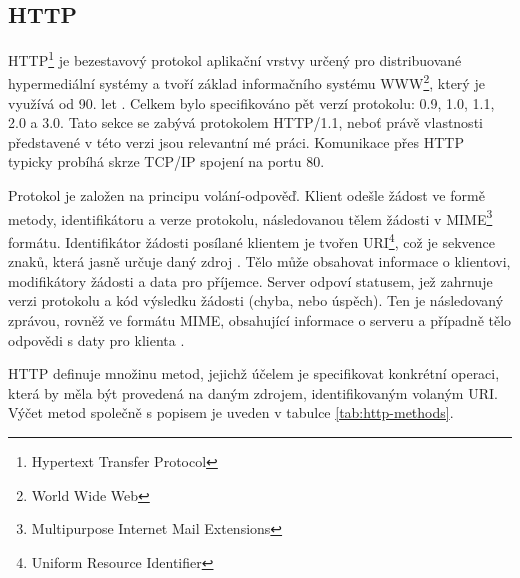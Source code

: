 \documentclass[czech,DP]{thesiskiv}
\begin{document}




\subsection{HTTP}

HTTP\footnote{Hypertext Transfer Protocol} je bezestavový protokol aplikační vrstvy určený pro distribuované hypermediální systémy a tvoří základ informačního systému WWW\footnote{World Wide Web}, který je využívá od 90. let \cite{httpRfc}. Celkem bylo specifikováno pět verzí protokolu: 0.9, 1.0, 1.1, 2.0 a 3.0. Tato sekce se zabývá protokolem HTTP/1.1, neboť právě vlastnosti představené v této verzi jsou relevantní mé práci. Komunikace přes HTTP typicky probíhá skrze TCP/IP spojení na portu 80. 

Protokol je založen na principu volání-odpověď. Klient odešle žádost ve formě metody, identifikátoru a verze protokolu, následovanou tělem žádosti v MIME\footnote{Multipurpose Internet Mail Extensions} formátu. Identifikátor žádosti posílané klientem je tvořen URI\footnote{Uniform Resource Identifier}, což je sekvence znaků, která jasně určuje daný zdroj \cite{uriRfc}. Tělo může obsahovat informace o klientovi, modifikátory žádosti a data pro příjemce. Server odpoví statusem, jež zahrnuje verzi protokolu a kód výsledku žádosti (chyba, nebo úspěch). Ten je následovaný zprávou, rovněž ve formátu MIME, obsahující informace o serveru a případně tělo odpovědi s daty pro klienta \cite{httpRfc}.

HTTP definuje množinu metod, jejichž účelem je specifikovat konkrétní operaci, která by měla být provedená na daným zdrojem, identifikovaným volaným URI. Výčet metod společně s popisem je uveden v tabulce \ref{tab:http-methods}.
\end{document}
